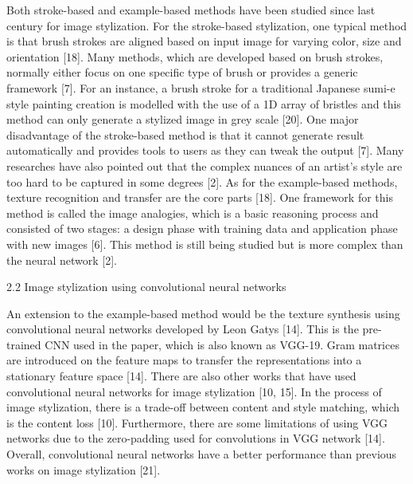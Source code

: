 \documentclass[runningheads]{llncs}
\begin{document}
Both stroke-based and example-based methods have been studied since last century 
for image stylization. For the stroke-based stylization, one typical method is 
that brush strokes are aligned based on input image for varying color, size and 
orientation [18]. Many methods, which are developed based on brush strokes, 
normally either focus on one specific type of brush or provides a generic 
framework [7]. For an instance, a brush stroke for a traditional Japanese 
sumi-e style painting creation is modelled with the use of a 1D array of 
bristles and this method can only generate a stylized image in grey scale [20]. 
One major disadvantage of the stroke-based method is that it cannot generate 
result automatically and provides tools to users as they can tweak the output 
[7]. Many researches have also pointed out that the complex nuances of an 
artist’s style are too hard to be captured in some degrees [2]. As for the 
example-based methods, texture recognition and transfer are the core parts [18].
One framework for this method is called the image analogies, which is a basic 
reasoning process and consisted of two stages: a design phase with training 
data and application phase with new images [6]. This method is still being 
studied but is more complex than the neural network [2]. 

2.2 Image stylization using convolutional neural networks

An extension to the example-based method would be the texture synthesis using 
convolutional neural networks developed by Leon Gatys [14]. This is the 
pre-trained CNN used in the paper, which is also known as VGG-19. Gram matrices 
are introduced on the feature maps to transfer the representations into a 
stationary feature space [14]. There are also other works that have used 
convolutional neural networks for image stylization [10, 15]. In the process of 
image stylization, there is a trade-off between content and style matching, 
which is the content loss [10]. Furthermore, there are some limitations of 
using VGG networks due to the zero-padding used for convolutions in VGG network 
[14]. Overall, convolutional neural networks have a better performance than 
previous works on image stylization [21]. 
\end{document}
